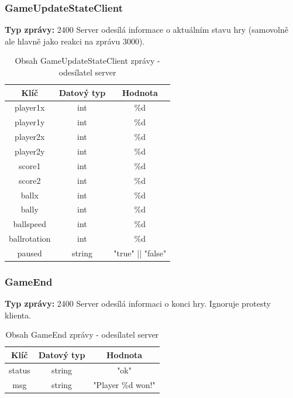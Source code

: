 \documentclass[12pt, a4paper]{article}
\begin{document}
\subsubsection{GameUpdateStateClient}
\textbf{Typ zprávy: } 2400 \newline
Server odesílá informace o aktuálním stavu hry (samovolně ale hlavně jako reakci na zprávu 3000). \newline

    \begin{table}[H]
        \centering
        \begin{tabular}{|c|c|c|}
            \hline
            Klíč & Datový typ & Hodnota \\
            \hline
            \hline
            player1x & int & \%d \\
            \hline
            player1y & int & \%d \\
            \hline
            player2x & int & \%d \\
            \hline
            player2y & int & \%d \\
            \hline
            score1 & int & \%d \\
            \hline
            score2 & int & \%d \\
            \hline
            ballx & int & \%d \\
            \hline
            bally & int & \%d \\
            \hline
            ballspeed & int & \%d \\
            \hline
            ballrotation & int & \%d \\
            \hline
            paused & string & "true" || "false" \\
            \hline
        \end{tabular}
        \caption{Obsah GameUpdateStateClient zprávy - odesílatel server}
    \end{table}

\subsubsection{GameEnd}
\textbf{Typ zprávy: } 2400 \newline
Server odesílá informaci o konci hry. Ignoruje protesty klienta. \newline

    \begin{table}[H]
        \centering
        \begin{tabular}{|c|c|c|}
            \hline
            Klíč & Datový typ & Hodnota \\
            \hline
            \hline
            status & string & "ok" \\
            \hline
            msg & string & "Player \%d won!" \\
            \hline
        \end{tabular}
        \caption{Obsah GameEnd zprávy - odesílatel server}
    \end{table}
\end{document}
